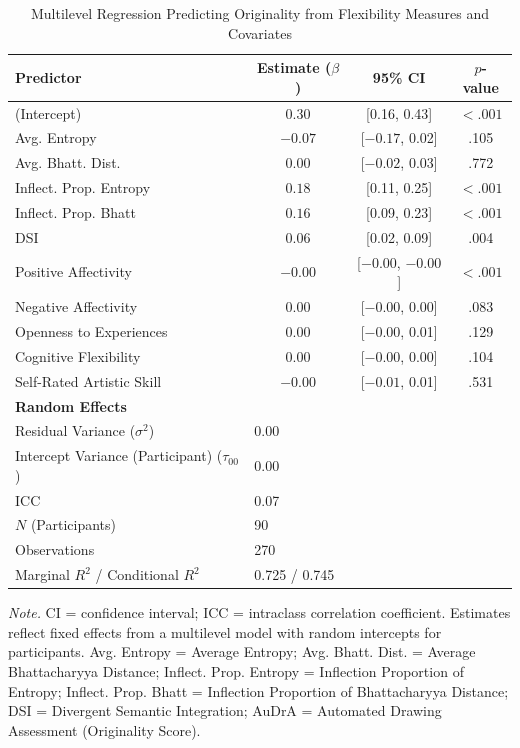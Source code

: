 \documentclass[../MA_Thesis.tex]{subfiles}
\begin{document}
\begin{table}[H]
\centering
\begin{threeparttable}
\caption{Multilevel Regression Predicting Originality from Flexibility Measures and Covariates}
\label{tab:multilevel_regression_results}
\begin{tabular}{lccc}
\toprule
\textbf{Predictor} & \textbf{Estimate} ($\beta$) & \textbf{95\% CI} & \textbf{$p$-value} \\
\midrule
(Intercept) & 0.30 & [0.16, 0.43] & $<.001$ \\
Avg. Entropy & $-0.07$ & [$-0.17$, 0.02] & .105 \\
Avg. Bhatt. Dist. & $0.00$ & [$-0.02$, 0.03] & .772 \\
Inflect. Prop. Entropy & $0.18$ & [0.11, 0.25] & $<.001$ \\
Inflect. Prop. Bhatt & $0.16$ & [0.09, 0.23] & $<.001$ \\
DSI & $0.06$ & [0.02, 0.09] & .004 \\
Positive Affectivity & $-0.00$ & [$-0.00$, $-0.00$] & $<.001$ \\
Negative Affectivity & $0.00$ & [$-0.00$, 0.00] & .083 \\
Openness to Experiences & $0.00$ & [$-0.00$, 0.01] & .129 \\
Cognitive Flexibility & $0.00$ & [$-0.00$, 0.00] & .104 \\
Self-Rated Artistic Skill & $-0.00$ & [$-0.01$, 0.01] & .531 \\
\midrule
\multicolumn{4}{l}{\textbf{Random Effects}} \\
\quad Residual Variance ($\sigma^2$) & \multicolumn{3}{l}{0.00} \\
\quad Intercept Variance (Participant) ($\tau_{00}$) & \multicolumn{3}{l}{0.00} \\
\quad ICC & \multicolumn{3}{l}{0.07} \\
\quad $N$ (Participants) & \multicolumn{3}{l}{90} \\
\quad Observations & \multicolumn{3}{l}{270} \\
\quad Marginal $R^2$ / Conditional $R^2$ & \multicolumn{3}{l}{0.725 / 0.745} \\
\bottomrule
\end{tabular}
\begin{tablenotes}[flushleft]
\small
\item \textit{Note.} CI = confidence interval; ICC = intraclass correlation coefficient. Estimates reflect fixed effects from a multilevel model with random intercepts for participants. Avg. Entropy = Average Entropy; Avg. Bhatt. Dist. = Average Bhattacharyya Distance; Inflect. Prop. Entropy = Inflection Proportion of Entropy; Inflect. Prop. Bhatt = Inflection Proportion of Bhattacharyya Distance; DSI = Divergent Semantic Integration; AuDrA = Automated Drawing Assessment (Originality Score).
\end{tablenotes}
\end{threeparttable}
\end{table}
\end{document}
